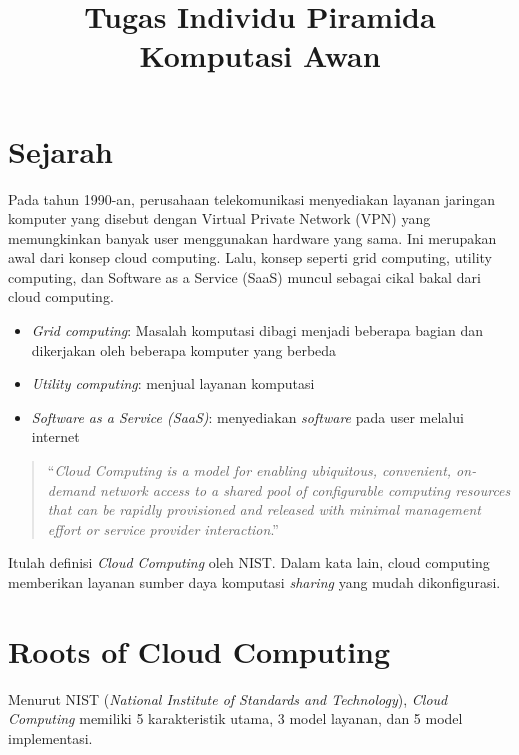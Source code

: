 \documentclass[conference]{IEEEtran}
\begin{document}
\title{Tugas Individu Piramida Komputasi Awan\\
}

\author{
}

\maketitle

\section{Sejarah}
Pada tahun 1990-an, perusahaan telekomunikasi menyediakan layanan jaringan komputer yang disebut dengan Virtual Private Network (VPN) yang memungkinkan banyak user menggunakan hardware yang sama. Ini merupakan awal dari konsep cloud computing. Lalu, konsep seperti grid computing, utility computing, dan Software as a Service (SaaS) muncul sebagai cikal bakal dari cloud computing.

\begin{itemize}
    \item \textit{Grid computing}: Masalah komputasi dibagi menjadi beberapa bagian dan dikerjakan oleh beberapa komputer yang berbeda
    \item \textit{Utility computing}: menjual layanan komputasi
    \item \textit{Software as a Service (SaaS)}: menyediakan \textit{software} pada user melalui internet
\end{itemize}

\begin{quote}
``\textit{Cloud Computing is a model for enabling ubiquitous, convenient, on-demand network access to a shared pool of configurable computing resources that can be rapidly provisioned and released with minimal management effort or service provider interaction}.''
\end{quote}
Itulah definisi \textit{Cloud Computing} oleh NIST. Dalam kata lain, cloud computing memberikan layanan sumber daya komputasi \textit{sharing} yang mudah dikonfigurasi.

\section{Roots of Cloud Computing}

Menurut NIST (\textit{National Institute of Standards and Technology}), \textit{Cloud Computing} memiliki 5 karakteristik utama, 3 model layanan, dan 5 model implementasi. 
\end{document}

